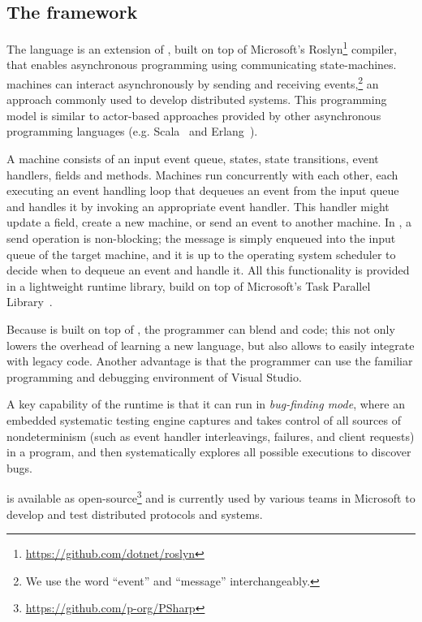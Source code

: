 \subsection{The \psharp framework}
\label{sec:method:psharp}

The \psharp language is an extension of \csharp, built on top of Microsoft's Roslyn\footnote{\url{https://github.com/dotnet/roslyn}} compiler, that enables asynchronous programming using communicating state-machines. \psharp machines can interact asynchronously by sending and receiving events,\footnote{We use the word ``event'' and ``message'' interchangeably.} an approach commonly used to develop distributed systems. This programming model is similar to actor-based approaches provided by other asynchronous programming languages (e.g. Scala~\cite{odersky2008programming} and Erlang~\cite{armstrong1996erlang}).

A \psharp machine consists of an input event queue, states, state transitions, event handlers, fields and methods. Machines run concurrently with each other, each executing an event handling loop that dequeues an event from the input queue and handles it by invoking an appropriate event handler. This handler might update a field, create a new machine, or send an event to another machine. In \psharp, a send operation is non-blocking; the message is simply enqueued into the input queue of the target machine, and it is up to the operating system scheduler to decide when to dequeue an event and handle it. All this functionality is provided in a lightweight runtime library, build on top of Microsoft's Task Parallel Library~\cite{leijen2009tpl}.

Because \psharp is built on top of \csharp, the programmer can blend \psharp and \csharp code; this not only lowers the overhead of learning a new language, but also allows \psharp to easily integrate with legacy code. Another advantage is that the programmer can use the familiar programming and debugging environment of Visual Studio.

A key capability of the \psharp runtime is that it can run in \emph{bug-finding mode}, where an embedded systematic testing engine captures and takes control of all sources of nondeterminism (such as event handler interleavings, failures, and client requests) in a \psharp program, and then systematically explores all possible executions to discover bugs.

\psharp is available as open-source\footnote{\url{https://github.com/p-org/PSharp}} and is currently used by various teams in Microsoft to develop and test distributed protocols and systems.

